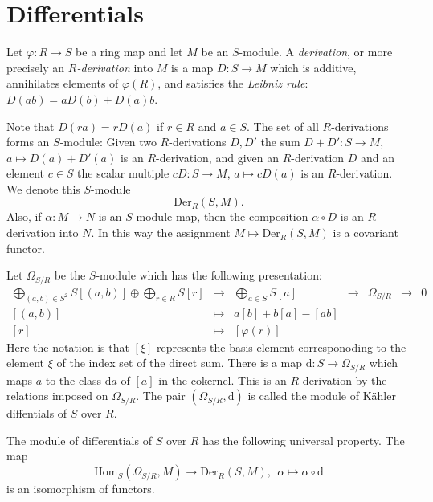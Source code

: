 \section{Differentials}
\label{section-differentials}

\begin{definition}
\label{definition-derivation}
Let $\varphi : R \to S$ be a ring map and let $M$ be an $S$-module.
A {\it derivation}, or more precisely an
{\it $R$-derivation} into $M$ is a map $D : S \to M$
which is additive, annihilates elements of $\varphi(R)$,
and satisfies the {\it Leibniz rule}:
$D(ab) = aD(b) + D(a)b$.
\end{definition}

\noindent
Note that $D(ra) = rD(a)$ if $r\in R$ and $a\in S$.
The set of all $R$-derivations forms an
$S$-module: Given two $R$-derivations $D, D'$
the sum $D + D' : S \to M$, $a \mapsto D(a)+D'(a)$
is an $R$-derivation, and given an $R$-derivation $D$
and an element $c\in S$ the scalar multiple $cD : S \to M$,
$a \mapsto cD(a)$ is an $R$-derivation. We denote this
$S$-module
$$
\text{Der}_R(S, M).
$$
Also, if $\alpha : M \to N$ is an $S$-module map, then the
composition $\alpha \circ D$ is an $R$-derivation into
$N$. In this way the assignment $M \mapsto \text{Der}_R(S, M)$
is a covariant functor.

\medskip\noindent
Let $\Omega_{S/R}$ be the $S$-module which has the
following presentation:
$$
\begin{matrix}
\bigoplus_{(a, b)\in S^2} S[(a, b)] \oplus \bigoplus_{r\in R} S[r]
&
\to
&
\bigoplus_{a\in S} S [a]
&
\to
&
\Omega_{S/R}
&
\to
&
0
\\
[(a, b)]
&
\mapsto
&
a[b] + b[a] - [ab]
&
&
&
&
\\
[r]
&
\mapsto
&
[\varphi(r)]
&
&
&
&
\end{matrix}
$$
Here the notation is that $[\xi]$ represents the basis
element corresponoding to the element $\xi$ of the index set
of the direct sum. There is a map $\text{d} : S \to \Omega_{S/R}$
which maps $a$ to the class $\text{d}a$ of $[a]$ in the cokernel.
This is an $R$-derivation by the relations imposed on $\Omega_{S/R}$.
The pair $(\Omega_{S/R}, \text{d})$ is called the module
of K\"ahler diffentials of $S$ over $R$.

\begin{lemma}
\label{lemma-universal-omega}
The module of differentials of $S$ over $R$ has the following
universal property. The map
$$
\text{Hom}_S(\Omega_{S/R}, M)
\longrightarrow
\text{Der}_R(S, M), \ \ 
\alpha
\longmapsto
\alpha \circ \text{d}
$$
is an isomorphism of functors.
\end{lemma}

